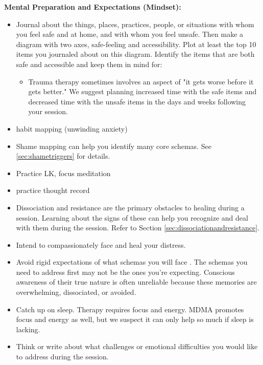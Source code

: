 \documentclass[12pt,letterpaper]{article}
\begin{document}
\noindent \textbf{Mental Preparation and Expectations (Mindset):}
\begin{itemize}
    \label{safetymapping}
    \item Journal about the things, places, practices, people, or situations with whom you feel safe and at home, and with whom you feel unsafe. Then make a diagram with two axes, safe-feeling and accessibility. Plot at least the top 10 items you journaled about on this diagram. Identify the items that are both safe and accessible and keep them in mind for:
    \begin{itemize}
        \item Trauma therapy sometimes involves an aspect of "it gets worse before it gets better." We suggest planning increased time with the safe items and decreased time with the unsafe items in the days and weeks following your session.
    \end{itemize}
    \item habit mapping (unwinding anxiety)
    \item Shame mapping can help you identify many core schemas. See \ref{sec:shametriggers} for details.
    \item Practice LK, focus meditation 
    \item practice thought record
    \item Dissociation and resistance are the primary obstacles to healing during a session. Learning about the signs of these can help you recognize and deal with them during the session. Refer to Section \ref{sec:dissociationandresistance}.
    \item Intend to compassionately face and heal your distress. 
    \item Avoid rigid expectations of what schemas you will face \cite{mithoeferManual}. The schemas you need to address first may not be the ones you're expecting. Conscious awareness of their true nature is often unreliable because these memories are overwhelming, dissociated, or avoided.
    \item Catch up on sleep. Therapy requires focus and energy. MDMA promotes focus and energy as well, but we suspect it can only help so much if sleep is lacking.
    \item Think or write about what challenges or emotional difficulties you would like to address during the session.

\end{itemize}
\end{document}
